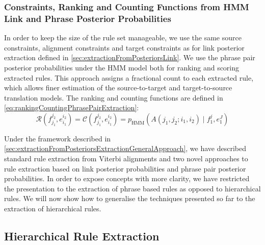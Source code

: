\subsubsection{Constraints, Ranking and Counting Functions from HMM Link and Phrase Posterior Probabilities}

In order to keep the size of the rule set manageable, we use
the same source constraints, alignment constraints and target constraints
as for link posterior extraction defined in
\autoref{sec:extractionFromPosteriorsLink}.
We use the phrase pair posterior probabilities under the HMM model both for ranking
and scoring
extracted rules. This approach assigns a fractional count to each extracted
rule, which allows finer estimation of the source-to-target and target-to-source
translation models.  The ranking and counting functions
are defined in \autoref{eq:rankingCountingPhrasePairExtraction}:
%
\begin{equation}
  \mathcal{R}(f_{j_1}^{j_2},e_{i_1}^{i_2}) = \mathcal{C}(f_{j_1}^{j_2},e_{i_1}^{i_2}) = p_{\text{HMM}}(A(j_1, j_2; i_1, i_2) \mid f_1^j, e_1^J)
  \label{eq:rankingCountingPhrasePairExtraction}
\end{equation}

Under the framework described in
\autoref{sec:extractionFromPosteriorsExtractionGeneralApproach}, we have
described standard rule extraction from Viterbi alignments and two novel
approaches to rule extraction based on link posterior probabilities and
phrase pair posterior probabilities. In order to expose concepts with more
clarity, we have restricted the presentation
to the extraction of phrase based rules as opposed to hierarchical rules.
We will now show how to generalise the techniques presented so far to
the extraction of hierarchical rules.

\subsection{Hierarchical Rule Extraction}
\label{sec:extractionFromPosteriorsExtractionDisjoint}

